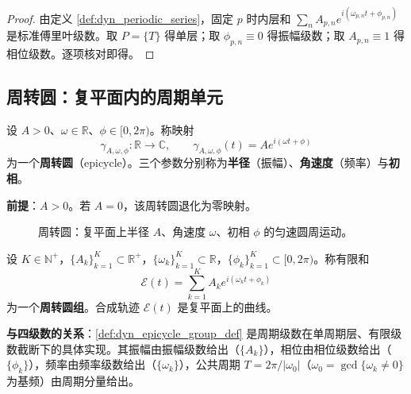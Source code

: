 \begin{proof}
由定义 \ref{def:dyn_periodic_series}，固定 $p$ 时内层和 $\sum_n A_{p,n}e^{i(\omega_{p,n}t+\phi_{p,n})}$ 是标准傅里叶级数。取 $P=\{T\}$ 得单层；取 $\phi_{p,n}\equiv0$ 得振幅级数；取 $A_{p,n}\equiv1$ 得相位级数。逐项核对即得。
\end{proof}

\subsection{周转圆：复平面内的周期单元}

\begin{definition}[周转圆]\label{def:dyn_epicycle}
设 $A>0$、$\omega\in\mathbb R$、$\phi\in[0,2\pi)$。称映射
\[
\gamma_{A,\omega,\phi}:\mathbb R\to\mathbb C,\qquad
\gamma_{A,\omega,\phi}(t)=A e^{i(\omega t+\phi)}
\]
为一个\textbf{周转圆}（epicycle）。三个参数分别称为\textbf{半径}（振幅）、\textbf{角速度}（频率）与\textbf{初相}。

\textbf{前提}：$A>0$。若 $A=0$，该周转圆退化为零映射。
\end{definition}

\begin{figure}[htbp]
\centering
{}
\caption{周转圆：复平面上半径 $A$、角速度 $\omega$、初相 $\phi$ 的匀速圆周运动。}
\label{fig:dyn_epicycle}
\end{figure}

\begin{definition}[周转圆组]\label{def:dyn_epicycle_group_def}
设 $K\in\mathbb N^+$，$\{A_k\}_{k=1}^{K}\subset\mathbb R^+$，$\{\omega_k\}_{k=1}^{K}\subset\mathbb R$，$\{\phi_k\}_{k=1}^{K}\subset[0,2\pi)$。称有限和
\[
\mathcal E(t)=\sum_{k=1}^{K}A_k e^{i(\omega_k t+\phi_k)}
\]
为一个\textbf{周转圆组}。合成轨迹 $\mathcal E(t)$ 是复平面上的曲线。

\textbf{与四级数的关系}：\cref{def:dyn_epicycle_group_def} 是周期级数在单周期层、有限级数截断下的具体实现。其振幅由振幅级数给出（$\{A_k\}$），相位由相位级数给出（$\{\phi_k\}$），频率由频率级数给出（$\{\omega_k\}$），公共周期 $T=2\pi/\lvert\omega_0\rvert$（$\omega_0=\gcd\{\omega_k\ne0\}$ 为基频）由周期分量给出。
\end{definition}

